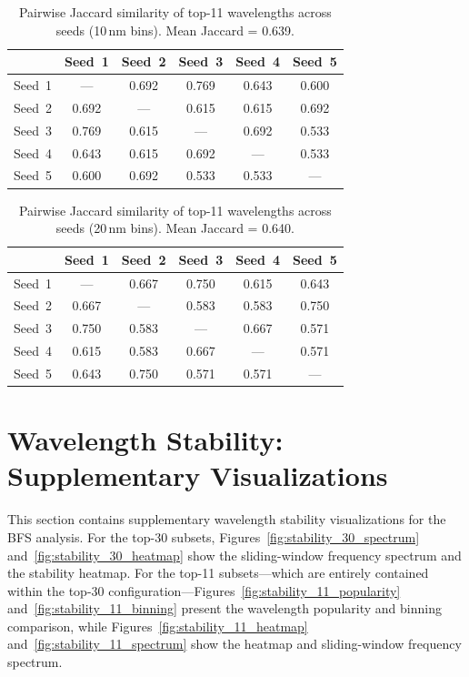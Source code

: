 \begin{table}[!htbp]
\centering
\caption[Jaccard similarity: top-11, 10\,nm bins]{Pairwise Jaccard similarity of top-11 wavelengths across seeds (10\,nm bins). Mean Jaccard = 0.639.}
\label{tab:binned_jaccard_11_bin10}
\begin{tabular}{cccccc}
\toprule
 & Seed~1 & Seed~2 & Seed~3 & Seed~4 & Seed~5 \\
\midrule
Seed~1 & ---   & 0.692 & 0.769 & 0.643 & 0.600 \\
Seed~2 & 0.692 & ---   & 0.615 & 0.615 & 0.692 \\
Seed~3 & 0.769 & 0.615 & ---   & 0.692 & 0.533 \\
Seed~4 & 0.643 & 0.615 & 0.692 & ---   & 0.533 \\
Seed~5 & 0.600 & 0.692 & 0.533 & 0.533 & ---   \\
\bottomrule
\end{tabular}
\end{table}

\begin{table}[!htbp]
\centering
\caption[Jaccard similarity: top-11, 20\,nm bins]{Pairwise Jaccard similarity of top-11 wavelengths across seeds (20\,nm bins). Mean Jaccard = 0.640.}
\label{tab:binned_jaccard_11_bin20}
\begin{tabular}{cccccc}
\toprule
 & Seed~1 & Seed~2 & Seed~3 & Seed~4 & Seed~5 \\
\midrule
Seed~1 & ---   & 0.667 & 0.750 & 0.615 & 0.643 \\
Seed~2 & 0.667 & ---   & 0.583 & 0.583 & 0.750 \\
Seed~3 & 0.750 & 0.583 & ---   & 0.667 & 0.571 \\
Seed~4 & 0.615 & 0.583 & 0.667 & ---   & 0.571 \\
Seed~5 & 0.643 & 0.750 & 0.571 & 0.571 & ---   \\
\bottomrule
\end{tabular}
\end{table}

\section{Wavelength Stability: Supplementary Visualizations}
\label{app:wavelength_details}

\noindent
This section contains supplementary wavelength stability visualizations for the BFS analysis.
For the top-30 subsets, Figures~\ref{fig:stability_30_spectrum} and~\ref{fig:stability_30_heatmap} show the sliding-window frequency spectrum and the stability heatmap.
For the top-11 subsets---which are entirely contained within the top-30 configuration---Figures~\ref{fig:stability_11_popularity} and~\ref{fig:stability_11_binning} present the wavelength popularity and binning comparison, while Figures~\ref{fig:stability_11_heatmap} and~\ref{fig:stability_11_spectrum} show the heatmap and sliding-window frequency spectrum.

